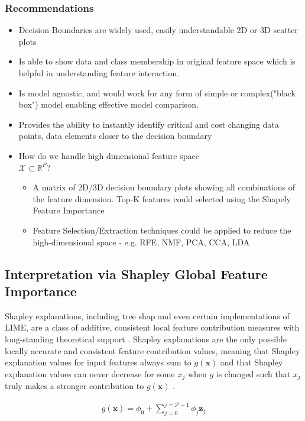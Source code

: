 \documentclass{article}
\begin{document}
\subsubsection{Recommendations}
\begin{itemize}
	\item Decision Boundaries are widely used, easily understandable 2D or 3D scatter plots \cite{migut2015visualizing}
	\item Is able to show data and class membership in original feature space which is helpful in understanding feature interaction.
	\item Is model agnostic, and would work for any form of simple or complex("black box") model enabling effective model comparison.
	\item Provides the ability to instantly identify critical and cost changing data points, data elements closer to the decision boundary
	\item How do we handle high dimensional feature space \\ $\mathcal{X} \subset \mathbb{R}^P$?
	\begin{itemize}
		\item A matrix of 2D/3D decision boundary plots showing all combinations of the feature dimension. Top-K features could selected using the Shapely Feature Importance
		\item Feature Selection/Extraction techniques could be applied to reduce the high-dimensional space - e.g. RFE, NMF, PCA, CCA, LDA
	\end{itemize}
\end{itemize}


\subsection{Interpretation via Shapley Global Feature Importance}

Shapley explanations, including tree shap and even certain implementations of LIME, are a class of additive, consistent local feature contribution measures with long-standing theoretical support \cite{shapley}. Shapley explanations are the only possible locally accurate and consistent feature contribution values, meaning that Shapley explanation values for input features always sum to $g(\mathbf{x})$ and that Shapley explanation values can never decrease for some $x_j$ when $g$ is changed such that $x_j$ truly makes a stronger contribution to $g(\mathbf{x})$ \cite{shapley}. 

\begin{equation}
\label{eq:shap_additive}
\begin{aligned}
g(\mathbf{x}) = \phi_0 + \sum_{j=0}^{j=\mathcal{P} - 1} \phi_j \mathbf{z}_j
\end{aligned}
\end{equation}
\end{document}

